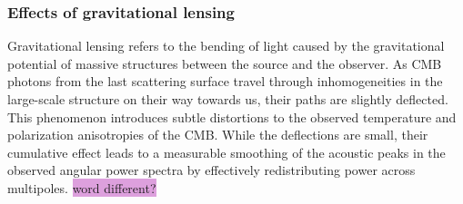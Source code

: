 \documentclass{aa}
\numberwithin{equation}{section}
\numberwithin{table}{section}
\numberwithin{figure}{section}
\begin{document}






\subsubsection{Effects of gravitational lensing}\label{subsubsec: IV theory lensing}
Gravitational lensing refers to the bending of light caused by the gravitational potential of massive structures between the source and the observer. As CMB photons from the last scattering surface travel through inhomogeneities in the large-scale structure on their way towards us, their paths are slightly deflected. This phenomenon introduces subtle distortions to the observed temperature and polarization anisotropies of the CMB. While the deflections are small, their cumulative effect leads to a measurable smoothing of the acoustic peaks in the observed angular power spectra by effectively redistributing power across multipoles. \colorbox{Plum}{word different?}
\end{document}

